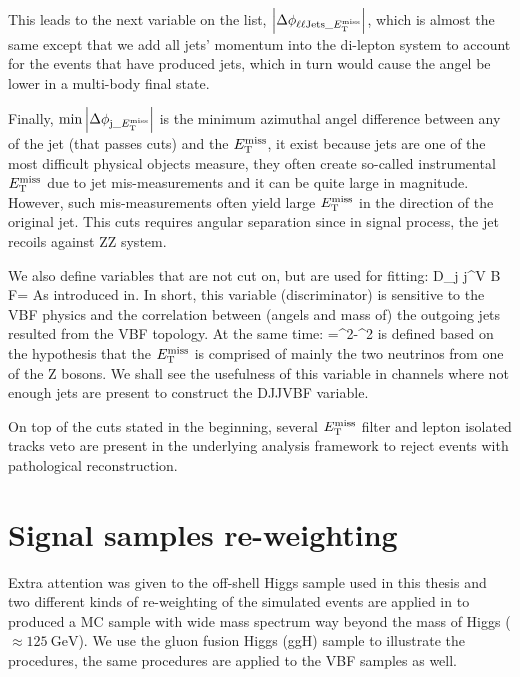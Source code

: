 This leads to the next variable on the list, $\abs{\Delta\phi_{\ell\ell\mathrm{Jets}\_E_{\mathrm{T}}^{\mathrm{miss}}}}$, which
is almost the same except that we add all jets' momentum into the di-lepton system to account
for the events that have produced jets, which in turn would cause the angel be lower in
a multi-body final state.

Finally, $\min{\abs{ \Delta\phi_{\mathrm{j}\_E_{\mathrm{T}}^{\mathrm{miss}}}}}$ is the minimum azimuthal angel difference between
any of the jet (that passes cuts) and the $E_{\mathrm{T}}^{\mathrm{miss}}$, it exist because jets are one of the 
most difficult physical objects measure, they often create so-called instrumental $E_{\mathrm{T}}^{\mathrm{miss}}$ due to jet
mis-measurements and it can be quite large in magnitude. However, such mis-measurements often yield large
$E_{\mathrm{T}}^{\mathrm{miss}}$ in the direction of the original jet. This cuts requires angular separation since in signal process,
the jet recoils against ZZ system.

We also define variables that are not cut on, but are used for fitting:
\be
D_{j j}^{V B F}=
\ee
As introduced in\cite{djjvbf}. In short, this variable (discriminator) is sensitive
to the VBF physics and the correlation between (angels and mass of) the outgoing jets resulted from the
VBF topology. At the same time:
\be
\mtzz={}^2-^{2}
\ee
is defined based on the hypothesis that the $E_{\mathrm{T}}^{\mathrm{miss}}$ is comprised of mainly the two neutrinos
from one of the Z bosons. We shall see the usefulness of this variable in channels where
not enough jets are present to construct the DJJVBF variable.

On top of the cuts stated in the beginning, several $E_{\mathrm{T}}^{\mathrm{miss}}$ filter and lepton isolated tracks veto
are present in the underlying analysis framework to reject events with pathological reconstruction.

\section{Signal samples re-weighting}
\label{sec:sig_rewgt}
Extra attention was given to the off-shell Higgs sample used in this thesis and two different kinds
of re-weighting of the simulated events are applied in to produced a MC sample with wide
mass spectrum way beyond the mass of Higgs ($\approx \SI{125}{\giga\electronvolt}$). We use the
gluon fusion Higgs (ggH) sample to illustrate the procedures, the same procedures are applied to
the VBF samples as well.

